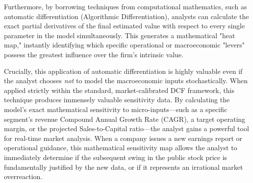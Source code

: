 Furthermore, by borrowing techniques from computational mathematics, such as automatic differentiation (Algorithmic Differentiation), analysts can calculate the exact partial derivatives of the final estimated value with respect to every single parameter in the model simultaneously. This generates a mathematical "heat map," instantly identifying which specific operational or macroeconomic "levers" possess the greatest influence over the firm's intrinsic value.

Crucially, this application of automatic differentiation is highly valuable even if the analyst chooses \textit{not} to model the macroeconomic inputs stochastically. When applied strictly within the standard, market-calibrated DCF framework, this technique produces immensely valuable sensitivity data. By calculating the model's exact mathematical sensitivity to micro-inputs—such as a specific segment's revenue Compound Annual Growth Rate (CAGR), a target operating margin, or the projected Sales-to-Capital ratio—the analyst gains a powerful tool for real-time market analysis. When a company issues a new earnings report or operational guidance, this mathematical sensitivity map allows the analyst to immediately determine if the subsequent swing in the public stock price is fundamentally justified by the new data, or if it represents an irrational market overreaction.